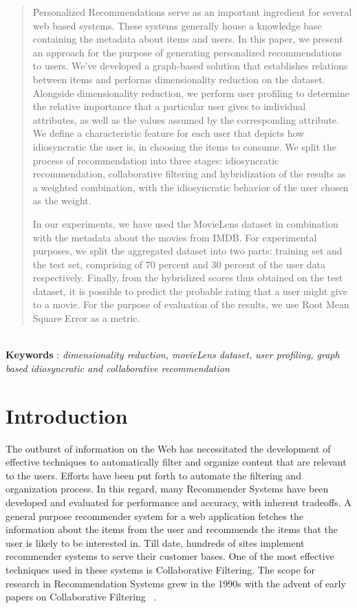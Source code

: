\documentclass{acm_proc_article-sp}
\begin{document}
\begin{abstract}
Personalized Recommendations serve as an important ingredient for several web based systems. These systems generally house a knowledge base containing the metadata about items and users. In this paper, we present an approach for the purpose of generating personalized recommendations to users. We've developed a graph-based solution that establishes relations between items and performs dimensionality reduction on the dataset. Alongside dimensionality reduction, we perform user profiling to determine the relative importance that a particular user gives to individual attributes, as well as the values assumed by the corresponding attribute. We define a characteristic feature for each user that depicts how idiosyncratic the user is, in choosing the items to consume. We split the process of recommendation into three stages: idiosyncratic recommendation, collaborative filtering and hybridization of the results as a weighted combination, with the idiosyncratic behavior of the user chosen as the weight.

In our experiments, we have used the MovieLens dataset in combination with the metadata about the movies from IMDB. For experimental purposes, we split the aggregated dataset into two parts: training set and the test set, comprising of 70 percent and 30 percent of the user data respectively. Finally, from the hybridized scores thus obtained on the test dataset, it is possible to predict the probable rating that a user might give to a movie. For the purpose of evaluation of the results, we use Root Mean Square Error as a metric.
\end{abstract}\\

\textbf{Keywords} : \emph{dimensionality reduction, movieLens dataset, user profiling, graph based idiosyncratic and collaborative recommendation}

\section{Introduction}

The outburst of information on the Web has necessitated the development of effective techniques to automatically filter and organize content that are relevant to the users. Efforts have been put forth to automate the filtering and organization process. In this regard, many Recommender Systems have been developed and evaluated for performance and accuracy, with inherent tradeoffs. A general purpose recommender system for a web application fetches the information about the items from the user and recommends the items that the user is likely to be interested in. Till date, hundreds of sites implement recommender systems to serve their customer bases. One of the most effective techniques used in these systems is Collaborative Filtering. The scope for research in Recommendation Systems grew in the 1990s with the advent of early papers on Collaborative Filtering ~\cite{resnick, shardanand, hill}. 
\end{document}
